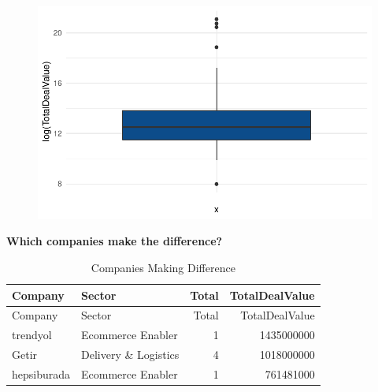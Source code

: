 \documentclass[
  letterpaper,
  DIV=11,
  numbers=noendperiod]{scrreprt}
\newenvironment{Shaded}{\begin{snugshade}}{\end{snugshade}}
\newcommand{\AttributeTok}[1]{\textcolor[rgb]{0.40,0.45,0.13}{#1}}
\newcommand{\ConstantTok}[1]{\textcolor[rgb]{0.56,0.35,0.01}{#1}}
\newcommand{\FloatTok}[1]{\textcolor[rgb]{0.68,0.00,0.00}{#1}}
\newcommand{\FunctionTok}[1]{\textcolor[rgb]{0.28,0.35,0.67}{#1}}
\newcommand{\NormalTok}[1]{\textcolor[rgb]{0.00,0.23,0.31}{#1}}
\newcommand{\OtherTok}[1]{\textcolor[rgb]{0.00,0.23,0.31}{#1}}
\newcommand{\SpecialCharTok}[1]{\textcolor[rgb]{0.37,0.37,0.37}{#1}}
\newcommand{\StringTok}[1]{\textcolor[rgb]{0.13,0.47,0.30}{#1}}
\begin{document}
\begin{figure}[H]

{\centering \includegraphics{./assignment1_files/figure-pdf/unnamed-chunk-6-1.pdf}

}

\end{figure}

\textbf{Which companies make the difference?}

\begin{Shaded}
\end{Shaded}

\begin{longtable}[]{@{}llrr@{}}
\caption{Companies Making Difference}\tabularnewline
\toprule()
Company & Sector & Total & TotalDealValue \\
\midrule()
\endfirsthead
\toprule()
Company & Sector & Total & TotalDealValue \\
\midrule()
\endhead
trendyol & Ecommerce Enabler & 1 & 1435000000 \\
Getir & Delivery \& Logistics & 4 & 1018000000 \\
hepsiburada & Ecommerce Enabler & 1 & 761481000 \\
\bottomrule()
\end{longtable}
\end{document}
